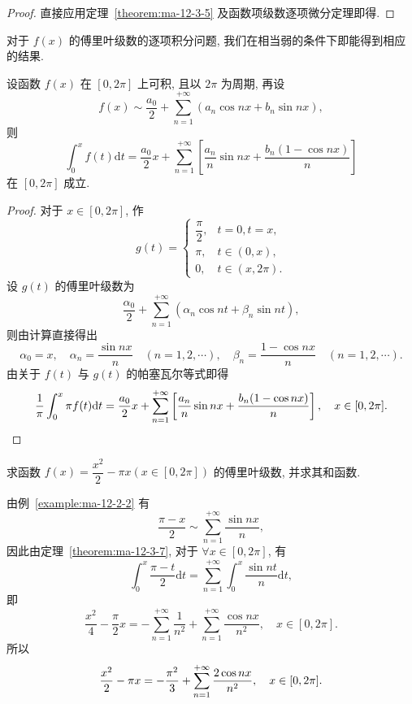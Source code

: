 \begin{proof}
直接应用定理~\ref{theorem:ma-12-3-5} 及函数项级数逐项微分定理即得.
\end{proof}


对于 $f(x)$ 的傅里叶级数的逐项积分问题, 我们在相当弱的条件下即能得到相应的结果.

\begin{theorem}[{傅里叶级数逐项积分定理}]\label{theorem:ma-12-3-7}
设函数 $f(x)$ 在 $[0,2\pi]$ 上可积, 且以 $2\pi$ 为周期, 再设
\[
  f(x)\sim\frac{a_0}{2}+\sum_{n=1}^{+\infty}(a_n\cos nx+b_n\sin nx),
\]
则
\[
  \int_0^xf(t)\mathrm dt
  =
  \frac{a_0}{2}x+\sum_{n=1}^{+\infty}
  \left[
    \frac{a_n}{n}\sin nx+\frac{b_n(1-\cos nx)}{n}
  \right]
\]
在 $[0,2\pi]$ 成立.
\end{theorem}


\begin{proof}
对于 $x\in[0,2\pi]$, 作
\[
  g(t)=
  \begin{cases}
    \dfrac{\pi}{2}, & t=0,t=x,\\
    \pi, & t\in(0,x),\\
    0, & t\in(x,2\pi).
  \end{cases}
\]
设 $g(t)$ 的傅里叶级数为
\[
  \frac{\alpha_0}{2}+\sum_{n=1}^{+\infty}(\alpha_n\cos nt+\beta_n\sin nt),
\]
则由计算直接得出
\[
  \alpha_0=x,\quad
  \alpha_n=\frac{\sin nx}{n}\quad(n=1,2,\cdots),\quad
  \beta_n=\frac{1-\cos nx}{n}\quad(n=1,2,\cdots).
\]
由关于 $f(t)$ 与 $g(t)$ 的帕塞瓦尔等式即得
\[
  \frac1\pi\int_0^x\pi f(t)\mathrm dt
  =
  \frac{a_0}{2}x
  +\sum_{n=1}^{+\infty}
  \left[
    \frac{a_n}{n}\sin nx+\frac{b_n(1-\cos nx)}{n}
  \right],
  \quad x\in[0,2\pi].
\qedhere
\]
\end{proof}


\begin{example}\label{example:ma-12-3-2}
求函数 $f(x)=\dfrac{x^2}{2}-\pi x(x\in[0,2\pi])$ 的傅里叶级数, 并求其和函数.
\end{example}


\begin{solve}
由例~\ref{example:ma-12-2-2} 有
\[
  \frac{\pi-x}{2}\sim\sum_{n=1}^{+\infty}\frac{\sin nx}{n},
\]
因此由定理~\ref{theorem:ma-12-3-7}, 对于 $\forall x\in[0,2\pi]$, 有
\[
  \int_0^x\frac{\pi-t}{2}\mathrm dt
  =
  \sum_{n=1}^{+\infty}\int_0^x\frac{\sin nt}{n}\mathrm dt,
\]
即
\[
  \frac{x^2}{4}-\frac{\pi}{2}x
  =
  -\sum_{n=1}^{+\infty}\frac1{n^2}
  +\sum_{n=1}^{+\infty}\frac{\cos nx}{n^2},\quad x\in[0,2\pi].
\]
所以
\[
  \frac{x^2}{2}-\pi x
  =
  -\frac{\pi^2}{3}+\sum_{n=1}^{+\infty}\frac{2\cos nx}{n^2},\quad x\in[0,2\pi].
\qedhere
\]
\end{solve}


